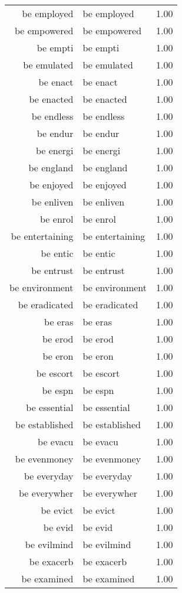 \begin{table}[ht]
\begin{tabular}{rlr}
  be employed & be employed & 1.00 \\ 
  be empowered & be empowered & 1.00 \\ 
  be empti & be empti & 1.00 \\ 
  be emulated & be emulated & 1.00 \\ 
  be enact & be enact & 1.00 \\ 
  be enacted & be enacted & 1.00 \\ 
  be endless & be endless & 1.00 \\ 
  be endur & be endur & 1.00 \\ 
  be energi & be energi & 1.00 \\ 
  be england & be england & 1.00 \\ 
  be enjoyed & be enjoyed & 1.00 \\ 
  be enliven & be enliven & 1.00 \\ 
  be enrol & be enrol & 1.00 \\ 
  be entertaining & be entertaining & 1.00 \\ 
  be entic & be entic & 1.00 \\ 
  be entrust & be entrust & 1.00 \\ 
  be environment & be environment & 1.00 \\ 
  be eradicated & be eradicated & 1.00 \\ 
  be eras & be eras & 1.00 \\ 
  be erod & be erod & 1.00 \\ 
  be eron & be eron & 1.00 \\ 
  be escort & be escort & 1.00 \\ 
  be espn & be espn & 1.00 \\ 
  be essential & be essential & 1.00 \\ 
  be established & be established & 1.00 \\ 
  be evacu & be evacu & 1.00 \\ 
  be evenmoney & be evenmoney & 1.00 \\ 
  be everyday & be everyday & 1.00 \\ 
  be everywher & be everywher & 1.00 \\ 
  be evict & be evict & 1.00 \\ 
  be evid & be evid & 1.00 \\ 
  be evilmind & be evilmind & 1.00 \\ 
  be exacerb & be exacerb & 1.00 \\ 
  be examined & be examined & 1.00 \\ 

\end{tabular}
\end{table}
